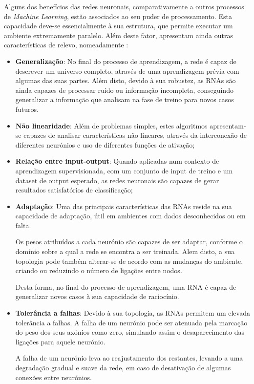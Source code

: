 Alguns dos benefícios das redes neuronais, comparativamente a outros processos de \textit{Machine Learning}, estão associados ao seu puder de processamento. Esta capacidade deve-se essencialmente à sua estrutura, que permite executar um ambiente extremamente paralelo.
Além deste fator, apresentam ainda outras características de relevo, nomeadamente \cite{ann-agility}  \cite{CortezNevesANN} \cite{Haykin-ANN}:
\begin{itemize} 
    \item \textbf{Generalização}: No final do processo de aprendizagem, a rede é capaz de descrever um universo completo, através de uma aprendizagem prévia com algumas das suas partes. 
    Além disto, devido à sua robustez, as RNAs são ainda capazes de processar ruído ou informação incompleta, conseguindo generalizar a informação que analisam na fase de treino para novos casos futuros. 
    
    \item \textbf{Não linearidade}: Além de problemas simples, estes algoritmos apresentam-se capazes de analisar características não lineares, através da interconexão de diferentes neurónios e uso de diferentes funções de ativação; 
    
    \item \textbf{Relação entre input-output}: Quando aplicadas num contexto de aprendizagem supervisionada, com um conjunto de input de treino e um dataset de output esperado, as redes neuronais são capazes de gerar resultados satisfatórios de classificação;
    
    \item \textbf{Adaptação}: Uma das principais características das RNAs reside na sua capacidade de adaptação, útil em ambientes com dados desconhecidos ou em falta. 
    
    Os pesos atribuídos a cada neurónio são capazes de ser adaptar, conforme o domínio sobre a qual a rede se encontra a ser treinada. Alem disto, a sua topologia pode também alterar-se de acordo com as mudanças do ambiente, criando ou reduzindo o número de ligações entre nodos. 

    Desta forma, no final do processo de aprendizagem, uma RNA é capaz de generalizar novos casos à sua capacidade de raciocínio. 
    
    \item \textbf{Tolerância a falhas}: Devido à sua topologia, as RNAs permitem um elevada tolerância a falhas. 
    A falha de um neurónio pode ser atenuada pela marcação do peso dos seus axónios como zero, simulando assim o desaparecimento das ligações para aquele neurónio. 
    
    A falha de um neurónio leva ao reajustamento dos restantes, levando a uma degradação gradual e suave da rede, em caso de desativação de algumas conexões entre neurónios. 
\end{itemize}


